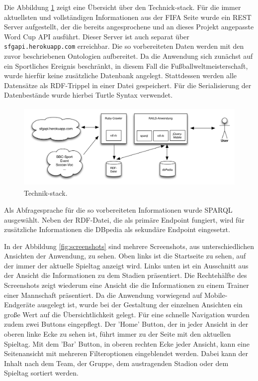 \documentclass[runningheads,a4paper]{llncs}
\begin{document}
Die Abbildung \ref{fig:example} zeigt eine Übersicht über den Technick-stack. Für die immer aktuellsten und vollständigen Informationen aus der FIFA Seite wurde ein REST Server aufgestellt, der die bereits angesprochene und an dieses Projekt angepasste Word Cup API ausführt. Dieser Server ist auch separat über \texttt{sfgapi.herokuapp.com} erreichbar. Die so vorbereiteten Daten werden mit den zuvor beschriebenen Ontologien aufbereitet. Da die Anwendung sich zunächst auf ein Sportliches Ereignis beschränkt, in diesem Fall die Fußballweltmeisterschaft, wurde hierfür keine zusätzliche Datenbank angelegt. Stattdessen werden alle Datensätze als RDF-Trippel in einer Datei gespeichert. Für die Serialisierung der Datenbestände wurde hierbei Turtle Syntax verwendet.
\begin{figure}
\centering
\includegraphics[height=4.2cm]{technik-stack}
\caption{Technik-stack.}
\label{fig:example}
\end{figure}


Als Abfragesprache für die so vorbereiteten Informationen wurde SPARQL ausgewählt. Neben der RDF-Datei, die als primäre Endpoint fungiert, wird für zusätzliche Informationen die DBpedia als sekundäre Endpoint eingesetzt. 

\newpage
In der Abbildung \ref{fig:screenshots} sind mehrere Screenshots, aus unterschiedlichen Ansichten der Anwendung, zu sehen. Oben links ist die Startseite zu sehen, auf der immer der aktuelle Spieltag anzeigt wird. Links unten ist ein Ausschnitt aus der Ansicht die Informationen zu dem Stadien präsentiert. Die Rechtehälfte des Screenshots zeigt wiederum eine Ansicht die die Informationen zu einem Trainer einer Mannschaft präsentiert. Da die Anwendung vorwiegend auf Mobile-Endgeräte ausgelegt ist, wurde bei der Gestaltung der einzelnen Ansichten ein große Wert auf die Übersichtlichkeit gelegt. Für eine schnelle Navigation wurden zudem zwei Buttons eingepflegt. Der 'Home' Button, der in jeder Ansicht in der oberen linke Ecke zu sehen ist, führt immer zu der Seite mit den aktuellen Spieltag. Mit dem 'Bar' Button, in oberen rechten Ecke jeder Ansicht, kann eine Seitenansicht mit mehreren Filteroptionen eingeblendet werden. Dabei kann der Inhalt nach dem Team, der Gruppe, dem austragenden Stadion oder dem Spieltag sortiert werden.
\end{document}
